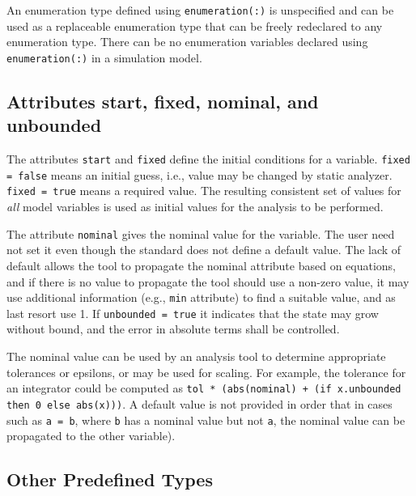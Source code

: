 An enumeration type defined using \lstinline!enumeration(:)! is unspecified and can be used as a replaceable enumeration type that can be freely redeclared to any enumeration type.
There can be no enumeration variables declared using \lstinline!enumeration(:)! in a simulation model.


\subsection{Attributes start, fixed, nominal, and unbounded}\label{attributes-start-fixed-nominal-and-unbounded}

The attributes \lstinline!start! and \lstinline!fixed! define the initial conditions for a variable.  \lstinline!fixed = false! means an initial guess, i.e., value may be changed by static analyzer.  \lstinline!fixed = true! means a required value.  The resulting consistent set of values for \emph{all} model variables is used as initial values for the analysis to be performed.

The attribute \lstinline!nominal! gives the nominal value for the variable.  The user need not set it even though the standard does not define a default value.  The lack of default allows the tool to propagate the nominal attribute based on equations, and if there is no value to propagate the tool should use a non-zero value, it may use additional information (e.g., \lstinline!min! attribute) to find a suitable value, and as last resort use 1.  If \lstinline!unbounded = true! it indicates that the state may grow without bound, and the error in absolute terms shall be controlled.

\begin{nonnormative}
The nominal value can be used by an analysis tool to determine appropriate tolerances or epsilons, or may be used for scaling.  For example, the tolerance for an integrator could be computed as \lstinline!tol * (abs(nominal) + (if x.unbounded then 0 else abs(x)))!.  A default value is not provided in order that in cases such as \lstinline!a = b!, where \lstinline!b! has a nominal value but not \lstinline!a!, the nominal value can be propagated to the other variable).
\end{nonnormative}


\subsection{Other Predefined Types}\label{other-predefined-types}

